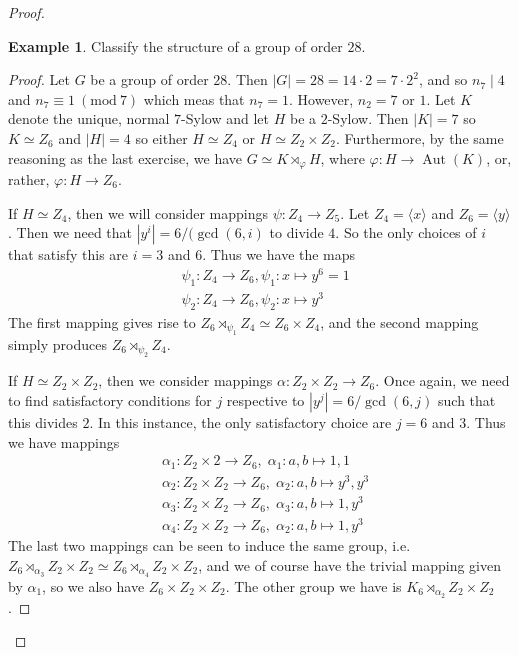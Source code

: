 \documentclass[9pt,reqno]{amsart}
\theoremstyle{definition}
\newtheorem{ex}{Example}[section]
\DeclareMathOperator{\aut}{Aut}
\newcommand{\Mod}[1]{\ (\mathrm{mod}\ #1)}
\begin{document}
\begin{proof}
\begin{ex}
Classify the structure of a group of order $28$.	
\end{ex}

\begin{proof}
	Let $G$ be a group of order $28$. Then $|G| = 28 = 14 \cdot 2  = 7 \cdot 2^2$, and so $n_7 \mid 4$ and $n_7 \equiv 1 \Mod{7}$ which meas that $n_7 = 1$. However, $n_2 = 7$ or $1$. Let $K$ denote the unique, normal $7$-Sylow and let $H$ be a $2$-Sylow. Then $|K| = 7$ so $K \simeq Z_6$ and $|H| = 4$ so either $H \simeq Z_4$ or $H \simeq Z_2 \times Z_2$. Furthermore, by the same reasoning as the last exercise, we have $G \simeq K \rtimes_\varphi H$, where $\varphi \colon H \to \aut (K)$, or, rather, $\varphi \colon H \to Z_6$. 
	
	If $H \simeq Z_4$, then we will consider mappings $\psi \colon Z_4 \to Z_5$. Let $Z_4 = \langle x \rangle $ and $Z_6 = \langle y \rangle$. Then we need that $|y^i| = 6/(\gcd(6, i)$ to divide $4$. So the only choices of $i$ that satisfy this are $i = 3$ and $6$. Thus we have the maps 
	\begin{align*}
		&\psi_1 \colon Z_4 \to Z_6, \psi_1 \colon x \mapsto y^6 = 1 \\
		& \psi_2 \colon Z_4 \to Z_6, \psi_2 \colon x \mapsto y^3
	\end{align*}
	The first mapping gives rise to $Z_6 \rtimes_{\psi_1} Z_4 \simeq Z_6 \times Z_4$, and the second mapping simply produces $Z_6 \rtimes_{\psi_2} Z_4$. 
	
	If $H \simeq Z_2 \times Z_2$, then we consider mappings $\alpha \colon Z_2 \times Z_2 \to Z_6$. Once again, we need to find satisfactory conditions for $j$ respective to $|y^j| = 6 / \gcd(6, j)$ such that this divides $2$. In this instance, the only satisfactory choice are $j = 6$ and $3$. Thus we have mappings 
	\begin{align*}
		& \alpha_1 \colon Z_2 \times 2 \to Z_6, \; \alpha_1 \colon a,b  \mapsto 1, 1 \\ 
		& \alpha_2 \colon Z_2 \times Z_2 \to Z_6, \; \alpha_2 \colon a,b \mapsto y^3, y^3 \\ 
		& \alpha_3 \colon Z_2 \times Z_2 \to Z_6, \; \alpha_3  \colon a,b \mapsto 1, y^3 \\
		& \alpha_4 \colon Z_2 \times Z_2 \to Z_6, \; \alpha_2 \colon a,b \mapsto 1, y^3 
	\end{align*}
	The last two mappings can be seen to induce the same group, i.e. $Z_6 \rtimes_{\alpha_3} Z_2 \times Z_2 \simeq Z_6 \rtimes_{\alpha_4} Z_2 \times Z_2$, and we of course have the trivial mapping given by $\alpha_1$, so we also have $Z_6 \times Z_2 \times Z_2$. The other group we have is $K_6 \rtimes_{\alpha_2} Z_2 \times Z_2$. 
\end{proof}


\end{proof}
\end{document}
